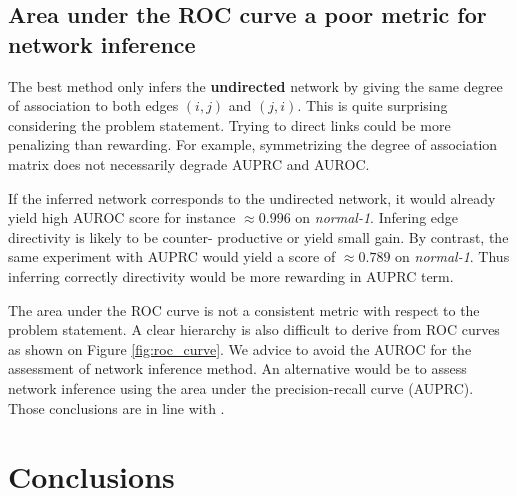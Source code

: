 \documentclass[wcp]{jmlr}
\begin{document}
\subsection*{Area under the ROC curve a poor metric for network inference}

The best method only infers the \textbf{undirected} network by giving the same
degree of association to both edges $(i,j)$ and $(j,i)$. This is quite
surprising considering the problem statement. Trying to direct links could be
more penalizing than rewarding. For example, symmetrizing the degree of
association matrix does not necessarily degrade AUPRC and AUROC.


If the inferred network corresponds to the undirected network, it would
already yield high AUROC score for instance $\approx 0.996$ on
\textit{normal-1}. Infering edge directivity is likely to be counter-
productive or yield small gain. By contrast, the same experiment with AUPRC
would yield a score of $\approx 0.789$ on \textit{normal-1}. Thus inferring
correctly directivity would be more rewarding in AUPRC term.




The area under the ROC curve is not a consistent metric with respect to the
problem statement. A clear hierarchy is also difficult to derive from ROC
curves as shown on Figure \ref{fig:roc_curve}. We advice to avoid the AUROC for
the assessment of network inference method. An alternative would be to assess
network inference using the area under the precision-recall curve (AUPRC).
Those conclusions are in line with \cite{schrynemackers2013protocols}.


\section{Conclusions} \label{sec:conclusion}


\end{document}
